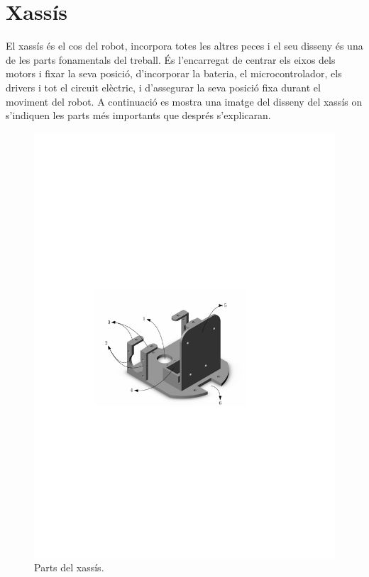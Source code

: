 \section{Xassís}

El xassís és el cos del robot, incorpora totes les altres peces i el seu disseny és una de les parts fonamentals del treball. És l’encarregat de centrar els eixos dels motors i fixar la seva posició, d’incorporar la bateria, el microcontrolador, els drivers i tot el circuit elèctric, i d'assegurar la seva posició fixa durant el moviment del robot. A continuació es mostra una imatge del disseny del xassís on s'indiquen les parts més importants que després s'explicaran. 

\begin{figure}[H]
	\centering
	\includegraphics{xassis}
	\caption{Parts del xassís.}
	\label{fig:xassis}
\end{figure}

